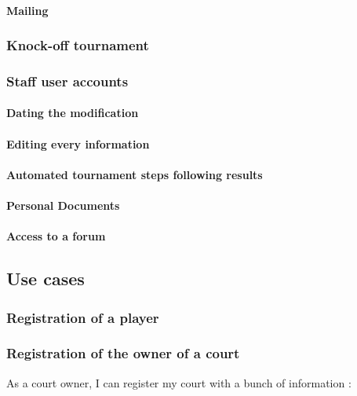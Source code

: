 \paragraph{Mailing}

\subsubsection{Knock-off tournament}
\subsubsection{Staff user accounts}

\paragraph{Dating the modification}
\paragraph{Editing every information}
\paragraph{Automated tournament steps following results}
\paragraph{Personal Documents}
\paragraph{Access to a forum}

\subsection{Use cases}
\subsubsection{Registration of a player}
\subsubsection{Registration of the owner of a court}

As a court owner, I can register my court with a bunch of information :

